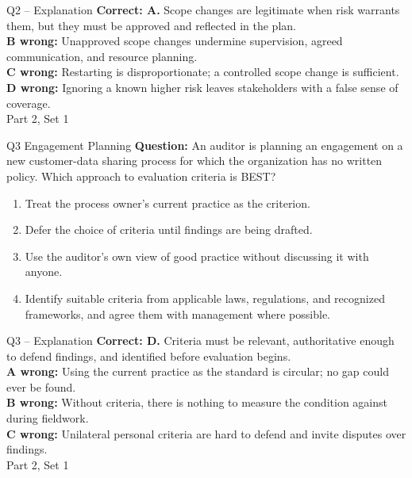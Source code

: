 \documentclass[aspectratio=169,10pt]{beamer}
\begin{document}
\begin{frame}[t]{Q2 -- Explanation}
	\footnotesize
	\textbf{Correct: A.} Scope changes are legitimate when risk warrants them, but they must be approved and reflected in the plan. \\[5pt]
\textbf{B wrong:} Unapproved scope changes undermine supervision, agreed communication, and resource planning. \\[3pt]
\textbf{C wrong:} Restarting is disproportionate; a controlled scope change is sufficient. \\[3pt]
\textbf{D wrong:} Ignoring a known higher risk leaves stakeholders with a false sense of coverage. \\[3pt]
	\vfill {\tiny Part 2, Set 1}
\end{frame}
\begin{frame}[t]{Q3 \hfill {\scriptsize Engagement Planning}}
	\small
	\textbf{Question:} An auditor is planning an engagement on a new customer-data sharing process for which the organization has no written policy. Which approach to evaluation criteria is BEST?
	\begin{enumerate}[label=\Alph*.,itemsep=1pt,topsep=3pt]
			\item Treat the process owner's current practice as the criterion.
			\item Defer the choice of criteria until findings are being drafted.
			\item Use the auditor's own view of good practice without discussing it with anyone.
			\item Identify suitable criteria from applicable laws, regulations, and recognized frameworks, and agree them with management where possible.
	\end{enumerate}
\end{frame}
\begin{frame}[t]{Q3 -- Explanation}
	\footnotesize
	\textbf{Correct: D.} Criteria must be relevant, authoritative enough to defend findings, and identified before evaluation begins. \\[5pt]
\textbf{A wrong:} Using the current practice as the standard is circular; no gap could ever be found. \\[3pt]
\textbf{B wrong:} Without criteria, there is nothing to measure the condition against during fieldwork. \\[3pt]
\textbf{C wrong:} Unilateral personal criteria are hard to defend and invite disputes over findings. \\[3pt]
	\vfill {\tiny Part 2, Set 1}
\end{frame}
\end{document}
